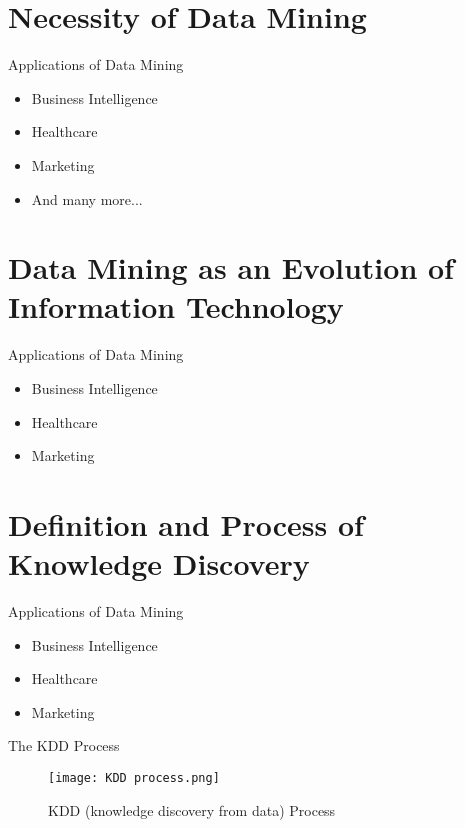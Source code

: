 \documentclass{beamer}
\begin{document}
\section{Necessity of Data Mining}
\begin{frame}{Applications of Data Mining}
    \begin{itemize}
        \item Business Intelligence
        \item Healthcare
        \item Marketing
        \item And many more...
    \end{itemize}
\end{frame}

\section{Data Mining as an Evolution of Information Technology}
\begin{frame}{Applications of Data Mining}
    \begin{itemize}
        \item Business Intelligence
        \item Healthcare
        \item Marketing
    \end{itemize}
\end{frame}


\section{Definition and Process of Knowledge Discovery}
\begin{frame}{Applications of Data Mining}
    \begin{itemize}
        \item Business Intelligence
        \item Healthcare
        \item Marketing
    \end{itemize}
\end{frame}

\begin{frame}{The KDD Process}
    \begin{figure}
        \centering
        \texttt{[image: KDD process.png]}
        \caption{KDD (knowledge discovery from data) Process}
    \end{figure}
\end{frame}
\end{document}
